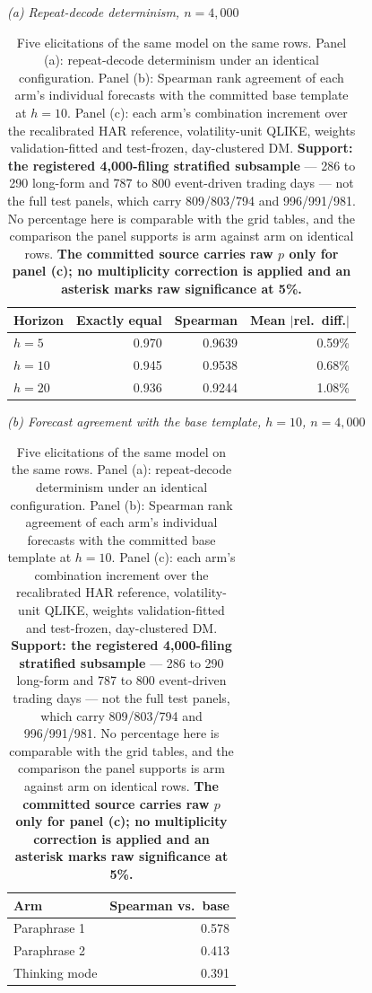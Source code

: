 \begin{table}[htbp]
\centering
\caption[Elicitation sensitivity of the prompted arm]{Five elicitations of
the same model on the same rows. Panel (a): repeat-decode determinism under
an identical configuration. Panel (b): Spearman rank agreement of each
arm's individual forecasts with the committed base template at $h{=}10$.
Panel (c): each arm's combination increment over the recalibrated HAR
reference, volatility-unit QLIKE, weights validation-fitted and
test-frozen, day-clustered DM. \textbf{Support: the registered
4{,}000-filing stratified subsample} --- 286 to 290 long-form and 787 to 800
event-driven trading days --- not the full test panels, which carry 809/803/794
and 996/991/981. No percentage
here is comparable with the grid tables, and the comparison the panel
supports is arm against arm on identical rows. \textbf{The committed source
carries raw $p$ only for panel (c); no multiplicity correction is applied
and an asterisk marks raw significance at 5\%.}}
\label{tab:app-elicit}
\singlespacing\footnotesize
\setlength{\tabcolsep}{3.5pt}

\emph{(a) Repeat-decode determinism, $n = 4{,}000$}\\[0.4ex]
\begin{tabular}{@{}lrrr@{}}
\toprule
Horizon & Exactly equal & Spearman & Mean $|$rel.\ diff.$|$ \\
\midrule
$h=5$ & 0.970 & 0.9639 & 0.59\% \\
$h=10$ & 0.945 & 0.9538 & 0.68\% \\
$h=20$ & 0.936 & 0.9244 & 1.08\% \\
\bottomrule
\end{tabular}

\vspace{1.2ex}
\emph{(b) Forecast agreement with the base template, $h = 10$, $n = 4{,}000$}\\[0.4ex]
\begin{tabular}{@{}lr@{}}
\toprule
Arm & Spearman vs.\ base \\
\midrule
Paraphrase 1 & 0.578 \\
Paraphrase 2 & 0.413 \\
Thinking mode & 0.391 \\
\bottomrule
\end{tabular}


\end{table}
